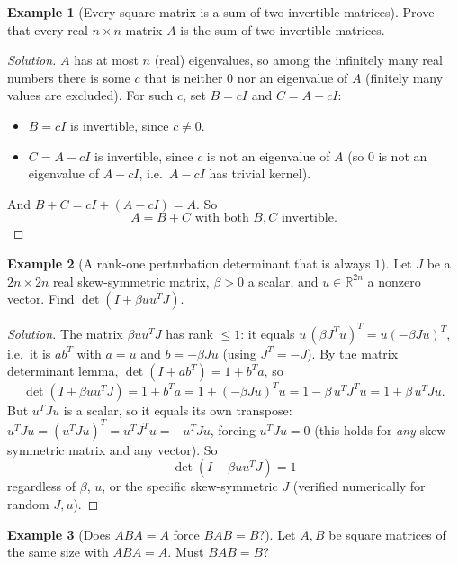 \documentclass[11pt]{article}
\theoremstyle{definition}
\newtheorem{example}{Example}[section]
\newcommand{\R}{\mathbb{R}}
\begin{document}
\begin{example}[Every square matrix is a sum of two invertible matrices]
Prove that every real $n\times n$ matrix $A$ is the sum of two invertible matrices.
\end{example}

\begin{proof}[Solution]
$A$ has at most $n$ (real) eigenvalues, so among the infinitely many real numbers there is some $c$ that is neither $0$ nor an eigenvalue of $A$ (finitely many values are excluded). For such $c$, set $B=cI$ and $C=A-cI$:
\begin{itemize}
\item $B=cI$ is invertible, since $c\neq0$.
\item $C=A-cI$ is invertible, since $c$ is not an eigenvalue of $A$ (so $0$ is not an eigenvalue of $A-cI$, i.e.\ $A-cI$ has trivial kernel).
\end{itemize}
And $B+C=cI+(A-cI)=A$. So
\[
\boxed{A=B+C \text{ with both } B,C \text{ invertible}}.
\]
\end{proof}

\begin{example}[A rank-one perturbation determinant that is always $1$]
Let $J$ be a $2n\times2n$ real skew-symmetric matrix, $\beta>0$ a scalar, and $u\in\R^{2n}$ a nonzero vector. Find $\det(I+\beta uu^TJ)$.
\end{example}

\begin{proof}[Solution]
The matrix $\beta uu^TJ$ has rank $\le1$: it equals $u\,(\beta J^Tu)^T = u(-\beta Ju)^T$, i.e.\ it is $ab^T$ with $a=u$ and $b=-\beta Ju$ (using $J^T=-J$). By the matrix determinant lemma, $\det(I+ab^T)=1+b^Ta$, so
\[
\det(I+\beta uu^TJ)=1+b^Ta=1+(-\beta Ju)^Tu=1-\beta\,u^TJ^Tu=1+\beta\,u^TJu.
\]
But $u^TJu$ is a scalar, so it equals its own transpose: $u^TJu=(u^TJu)^T=u^TJ^Tu=-u^TJu$, forcing $u^TJu=0$ (this holds for \emph{any} skew-symmetric matrix and any vector). So
\[
\boxed{\det(I+\beta uu^TJ)=1}
\]
regardless of $\beta$, $u$, or the specific skew-symmetric $J$ (verified numerically for random $J,u$).
\end{proof}

\begin{example}[Does $ABA=A$ force $BAB=B$?]
Let $A,B$ be square matrices of the same size with $ABA=A$. Must $BAB=B$?
\end{example}
\end{document}
